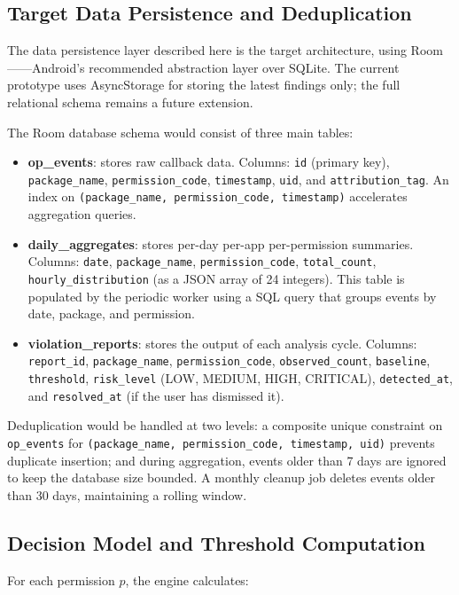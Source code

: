 \subsection{Target Data Persistence and Deduplication}

The data persistence layer described here is the target architecture, using Room——Android's recommended abstraction layer over SQLite. The current prototype uses AsyncStorage for storing the latest findings only; the full relational schema remains a future extension.

The Room database schema would consist of three main tables:
\begin{itemize}
\item \textbf{op\_events}: stores raw callback data. Columns: \texttt{id} (primary key), \texttt{package\_name}, \texttt{permission\_code}, \texttt{timestamp}, \texttt{uid}, and \texttt{attribution\_tag}. An index on \texttt{(package\_name, permission\_code, timestamp)} accelerates aggregation queries.
\item \textbf{daily\_aggregates}: stores per-day per-app per-permission summaries. Columns: \texttt{date}, \texttt{package\_name}, \texttt{permission\_code}, \texttt{total\_count}, \texttt{hourly\_distribution} (as a JSON array of 24 integers). This table is populated by the periodic worker using a SQL query that groups events by date, package, and permission.
\item \textbf{violation\_reports}: stores the output of each analysis cycle. Columns: \texttt{report\_id}, \texttt{package\_name}, \texttt{permission\_code}, \texttt{observed\_count}, \texttt{baseline}, \texttt{threshold}, \texttt{risk\_level} (LOW, MEDIUM, HIGH, CRITICAL), \texttt{detected\_at}, and \texttt{resolved\_at} (if the user has dismissed it).
\end{itemize}

Deduplication would be handled at two levels: a composite unique constraint on \texttt{op\_events} for \texttt{(package\_name, permission\_code, timestamp, uid)} prevents duplicate insertion; and during aggregation, events older than 7 days are ignored to keep the database size bounded. A monthly cleanup job deletes events older than 30 days, maintaining a rolling window.

\subsection{Decision Model and Threshold Computation}

For each permission $p$, the engine calculates:

